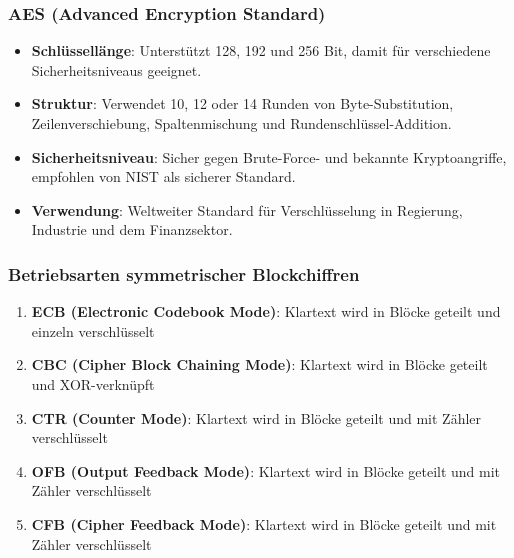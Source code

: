 \documentclass{article}
\begin{document}
\subsubsection{AES (Advanced Encryption Standard)}
\begin{itemize}
  \item \textbf{Schlüssellänge}: Unterstützt 128, 192 und 256 Bit, damit für verschiedene Sicherheitsniveaus geeignet.
  \item \textbf{Struktur}: Verwendet 10, 12 oder 14 Runden von Byte-Substitution, Zeilenverschiebung, Spaltenmischung und Rundenschlüssel-Addition.
  \item \textbf{Sicherheitsniveau}: Sicher gegen Brute-Force- und bekannte Kryptoangriffe, empfohlen von NIST als sicherer Standard.
  \item \textbf{Verwendung}: Weltweiter Standard für Verschlüsselung in Regierung, Industrie und dem Finanzsektor.
\end{itemize}

\subsubsection{Betriebsarten symmetrischer Blockchiffren}
\begin{enumerate}
  \item \textbf{ECB (Electronic Codebook Mode)}: Klartext wird in Blöcke geteilt und einzeln verschlüsselt
  \item \textbf{CBC (Cipher Block Chaining Mode)}: Klartext wird in Blöcke geteilt und XOR-verknüpft
  \item \textbf{CTR (Counter Mode)}: Klartext wird in Blöcke geteilt und mit Zähler verschlüsselt
  \item \textbf{OFB (Output Feedback Mode)}: Klartext wird in Blöcke geteilt und mit Zähler verschlüsselt
  \item \textbf{CFB (Cipher Feedback Mode)}: Klartext wird in Blöcke geteilt und mit Zähler verschlüsselt
\end{enumerate}




\end{document}
